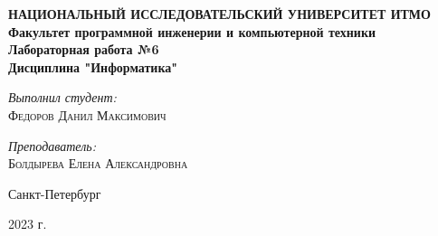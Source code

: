 \begin{titlepage} 
\begin{center}

\textbf{\Large НАЦИОНАЛЬНЫЙ ИССЛЕДОВАТЕЛЬСКИЙ УНИВЕРСИТЕТ ИТМО} \\[1.0cm]
\textbf{\large Факультет программной инженерии и компьютерной техники} \\[3.7cm]
 
\textbf{\LARGE Лабораторная работа №6} \\[0.5cm]
\textbf{\Large Дисциплина "Информатика"} \\[3.5cm]

\begin{flushright} \large
\emph{Выполнил студент:} \\
\textsc{Федоров Данил Максимович}
\end{flushright}

\begin{flushright} \large
\emph{Преподаватель:} \\
\textsc{Болдырева Елена Александровна}
\end{flushright}
\vfill 

{\large {Санкт-Петербург}} \par
{\large {2023 г.}}

\end{center} 
\end{titlepage}

\newpage
